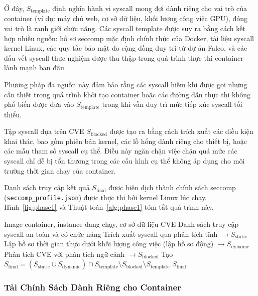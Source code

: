 Ở đây, $S_{\text{template}}$ định nghĩa hành vi syscall mong đợi dành riêng cho vai trò của
container (ví dụ: máy chủ web, cơ sở dữ liệu, khối lượng công việc GPU), đóng vai trò là ranh
giới chức năng. Các syscall template được suy ra bằng cách kết hợp nhiều nguồn: hồ sơ seccomp
mặc định chính thức của Docker, tài liệu syscall kernel Linux, các quy tắc bảo mật do cộng đồng
duy trì từ dự án Falco, và các dấu vết syscall thực nghiệm được thu thập trong quá trình thực
thi container lành mạnh ban đầu.

Phương pháp đa nguồn này đảm bảo rằng các syscall hiếm khi được gọi nhưng cần thiết trong quá
trình khởi tạo container hoặc các đường dẫn thực thi không phổ biến được đưa vào $S_{\text{template}}$
trong khi vẫn duy trì mức tiếp xúc syscall tối thiểu.

Tập syscall dựa trên CVE $S_{\text{blocked}}$ được tạo ra bằng cách trích xuất các điều kiện
khai thác, bao gồm phiên bản kernel, các lỗ hổng dành riêng cho thiết bị, hoặc các mẫu tham số
syscall cụ thể. Điều này ngăn chặn việc chặn quá mức các syscall chỉ dễ bị tổn thương trong các
cấu hình cụ thể không áp dụng cho môi trường thời gian chạy của container.

Danh sách truy cập kết quả $S_{\text{final}}$ được biên dịch thành chính sách seccomp
(\texttt{seccomp\_profile.json}) được thực thi bởi kernel Linux lúc chạy. Hình~\ref{fig:phase1}
và Thuật toán~\ref{alg:phase1} tóm tắt quá trình này.

\begin{algorithm}[htbp]
\caption{Lập Hồ Sơ Syscall Kết Hợp Nâng Cao}
\label{alg:phase1}
\begin{algorithmic}[1]
  \Require Image container, instance đang chạy, cơ sở dữ liệu CVE
  \Ensure Danh sách truy cập syscall an toàn và có chức năng
  \State Trích xuất syscall qua phân tích tĩnh $\to S_{\text{static}}$
  \State Lập hồ sơ thời gian thực dưới khối lượng công việc (lập hồ sơ động) $\to S_{\text{dynamic}}$
  \State Phân tích CVE với phân tích ngữ cảnh $\to S_{\text{blocked}}$
  \State Tạo $S_{\text{final}} = (S_{\text{static}} \cup S_{\text{dynamic}})
         \cap S_{\text{template}} \setminus S_{\text{blocked}} \setminus S_{\text{template}}$
  \State \Return $S_{\text{final}}$
\end{algorithmic}
\end{algorithm}

\subsubsection{Tải Chính Sách Dành Riêng cho Container}
\label{subsubsec:policy_upload}

